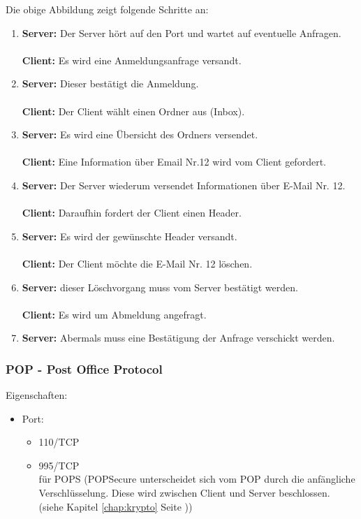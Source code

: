 \documentclass[12pt,a4paper]{report}
\begin{document}
\begin{onehalfspace}
Die obige Abbildung zeigt folgende Schritte an: 
\begin{enumerate}
\item \textbf{Server:} Der Server hört auf den Port und wartet auf eventuelle Anfragen.\\\\
\textbf{Client:} Es wird eine Anmeldungsanfrage versandt.
\item \textbf{Server:} Dieser bestätigt die Anmeldung.\\\\
\textbf{Client:} Der Client wählt einen Ordner aus (Inbox). 
\item \textbf{Server:} Es wird eine Übersicht des Ordners versendet.\\\\
\textbf{Client:}  Eine Information über Email Nr.12 wird vom Client gefordert.
\item \textbf{Server:} Der Server wiederum versendet Informationen über E-Mail Nr. 12. \\\\
\textbf{Client:} Daraufhin fordert der Client einen Header. 
\item \textbf{Server:} Es wird der gewünschte Header versandt. \\\\
\textbf{Client:} Der Client möchte die E-Mail Nr. 12 löschen.
\item \textbf{Server:} dieser Löschvorgang muss vom Server bestätigt werden.\\\\
\textbf{Client:} Es wird um Abmeldung angefragt.
\item \textbf{Server:} Abermals muss eine Bestätigung der Anfrage verschickt werden.
\end{enumerate}
\subsubsection{POP - Post Office Protocol}
Eigenschaften:\\
\begin{itemize}
\item Port:
\begin{itemize}
\item 110/TCP
\item 995/TCP\\
für POPS (POPSecure unterscheidet sich vom POP durch die anfängliche Verschlüsselung. Diese wird zwischen Client und Server beschlossen.  (siehe Kapitel \ref{chap:krypto} Seite \pageref{chap:krypto}))


\end{itemize}
\end{itemize}
\end{onehalfspace}
\end{document}

